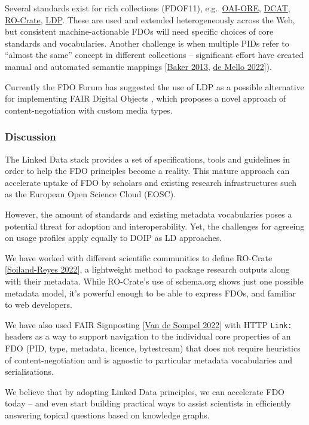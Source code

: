 Several standards exist for rich collections (FDOF11),
e.g.~\href{https://www.openarchives.org/ore/}{OAI-ORE},
\href{https://www.w3.org/TR/vocab-dcat-3/}{DCAT},
\href{https://www.researchobject.org/ro-crate/}{RO-Crate},
\href{https://www.w3.org/TR/ldp/}{LDP}. These are used and extended
heterogeneously across the Web, but consistent machine-actionable FDOs
will need specific choices of core standards and vocabularies. Another
challenge is when multiple PIDs refer to ``almost the same'' concept in
different collections -- significant effort have created manual and
automated semantic mappings
{[}\href{https://doi.org/10.1016/j.websem.2013.05.001}{Baker 2013},
\href{https://doi.org/10.1007/s12553-022-00639-w}{de Mello 2022}{]}).

Currently the FDO Forum has suggested the use of LDP as a possible
alternative for implementing FAIR Digital Objects \cite{bonino2021}, which
proposes a novel approach of content-negotiation with custom media
types.

\hypertarget{discussion}{%
\subsubsection{Discussion}\label{discussion}}

The Linked Data stack provides a set of specifications, tools and
guidelines in order to help the FDO principles become a reality. This
mature approach can accelerate uptake of FDO by scholars and existing
research infrastructures such as the European Open Science Cloud (EOSC).

However, the amount of standards and existing metadata vocabularies
poses a potential threat for adoption and interoperability. Yet, the
challenges for agreeing on usage profiles apply equally to DOIP as LD
approaches.

We have worked with different scientific communities to define RO-Crate
{[}\href{https://doi.org/10.3233/DS-210053}{Soiland-Reyes 2022}{]}, a
lightweight method to package research outputs along with their
metadata. While RO-Crate's use of schema.org shows just one possible
metadata model, it's powerful enough to be able to express FDOs, and
familiar to web developers.

We have also used FAIR Signposting
{[}\href{https://signposting.org/FAIR/}{Van de Sompel 2022}{]} with HTTP
\texttt{Link:} headers as a way to support navigation to the individual
core properties of an FDO (PID, type, metadata, licence, bytestream)
that does not require heuristics of content-negotiation and is agnostic
to particular metadata vocabularies and serialisations.

We believe that by adopting Linked Data principles, we can accelerate
FDO today -- and even start building practical ways to assist scientists
in efficiently answering topical questions based on knowledge graphs.

